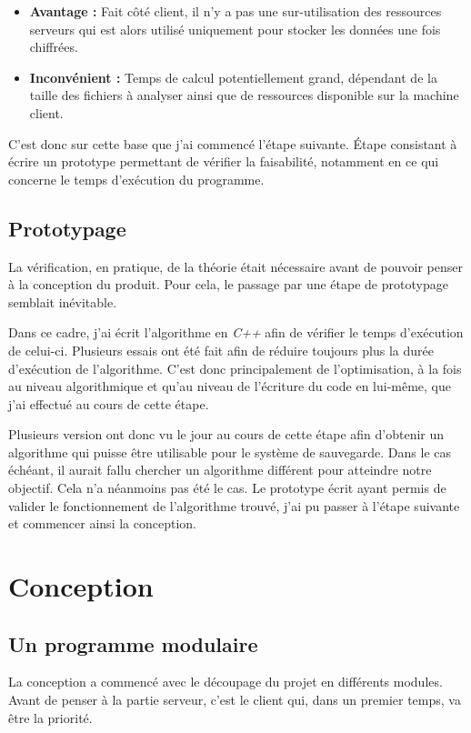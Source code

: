 \documentclass[a4paper,10pt, twoside]{report}
\begin{document}
\begin{spacing}{1.2}
\begin{itemize}
 \item \textbf{Avantage :} Fait côté client, il n'y a pas une
 sur-utilisation des ressources serveurs qui est alors utilisé uniquement
 pour stocker les données une fois chiffrées.
 
 \item \textbf{Inconvénient :} Temps de calcul potentiellement grand,
 dépendant de la taille des fichiers à analyser ainsi que de ressources
 disponible sur la machine client.
\end{itemize}

C'est donc sur cette base que j'ai commencé l'étape suivante. Étape 
consistant à écrire un prototype permettant de vérifier la faisabilité,
notamment en ce qui concerne le temps d'exécution du programme.

\subsection{Prototypage}
La vérification, en pratique, de la théorie était nécessaire avant de
pouvoir penser à la conception du produit. Pour cela, le passage par une
étape de prototypage semblait inévitable.

Dans ce cadre, j'ai écrit l'algorithme en \textit{C++} afin de vérifier
le temps d'exécution de celui-ci. Plusieurs essais ont été fait afin de
réduire toujours plus la durée d'exécution de l'algorithme. C'est donc
principalement de l'optimisation, à la fois au niveau algorithmique et
qu'au niveau de l'écriture du code en lui-même, que j'ai effectué  au
cours de cette étape.

Plusieurs version ont donc vu le jour au cours de cette étape afin d'obtenir
un algorithme qui puisse être utilisable pour le système de sauvegarde. Dans
le cas échéant, il aurait fallu chercher un algorithme différent pour
atteindre notre objectif. Cela n'a néanmoins pas été le cas. Le
prototype écrit ayant permis de valider le fonctionnement de l'algorithme
trouvé, j'ai pu passer à l'étape suivante et commencer ainsi la
conception.

\section{Conception}
\subsection{Un programme modulaire}
La conception a commencé avec le découpage du projet en différents
modules. Avant de penser à la partie serveur, c'est le client qui, dans un
premier temps, va être la priorité.


\end{spacing}
\end{document}
